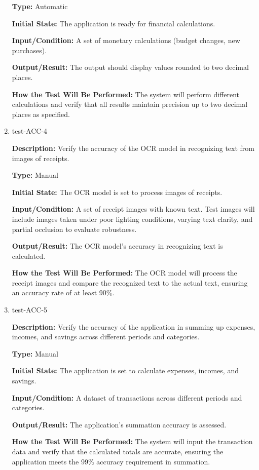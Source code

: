 \documentclass[12pt, titlepage]{article}
\begin{document}
\begin{enumerate}
\textbf{Type:} Automatic
					
\textbf{Initial State:} The application is ready for financial calculations.
					
\textbf{Input/Condition:} A set of monetary calculations (budget changes, new
purchases).
					
\textbf{Output/Result:} The output should display values rounded to two decimal
places.
					
\textbf{How the Test Will Be Performed:} The system will perform different
calculations and verify that all results maintain precision up to two decimal
places as specified.

\item{test-ACC-4\\}

\textbf{Description:} Verify the accuracy of the OCR model in recognizing text
from images of receipts.

\textbf{Type:} Manual
					
\textbf{Initial State:} The OCR model is set to process images of receipts.
					
\textbf{Input/Condition:} A set of receipt images with known text. Test images will include images taken 
under poor lighting conditions, varying text clarity, and partial occlusion to evaluate robustness.
					
\textbf{Output/Result:} The OCR model's accuracy in recognizing text is
calculated.
					
\textbf{How the Test Will Be Performed:} The OCR model will process the receipt
images and compare the recognized text to the actual text, ensuring an accuracy
rate of at least 90\%.

\item{test-ACC-5\\}

\textbf{Description:} Verify the accuracy of the application in summing up
expenses, incomes, and savings across different periods and categories.

\textbf{Type:} Manual
					
\textbf{Initial State:} The application is set to calculate expenses, incomes,
and savings.
					
\textbf{Input/Condition:} A dataset of transactions across different periods and
categories.
					
\textbf{Output/Result:} The application's summation accuracy is assessed.
					
\textbf{How the Test Will Be Performed:} The system will input the transaction
data and verify that the calculated totals are accurate, ensuring the
application meets the 99\% accuracy requirement in summation.


\end{enumerate}
\end{document}
